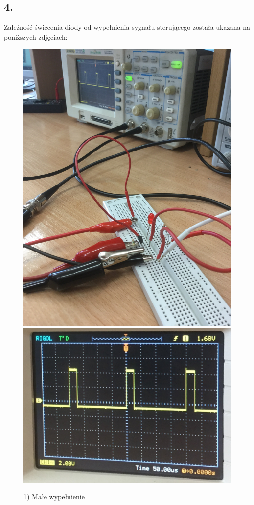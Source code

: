 \documentclass[polish,a4paper]{article}
\begin{document}
\newpage
\subsection*{4.}
Zależność świecenia diody od wypełnienia sygnału sterującego została ukazana na poniższych zdjęciach:\\

\begin{figure}
\caption{1) Małe wypełnienie}
\includegraphics[scale=0.05]{male}
\includegraphics[scale=0.25]{maleOsc}


\end{figure}
\end{document}
